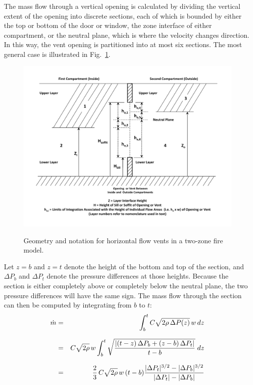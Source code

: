 The mass flow through a vertical opening is calculated by dividing the vertical extent of the opening into discrete sections, each of which is bounded by either the top or bottom of the door or window, the zone interface of either compartment, or the neutral plane, which is where the velocity changes direction. In this way, the vent opening is partitioned into at most six sections.  The most general case is illustrated in Fig.~\ref{fig:Flow_Notation}.
\begin{figure}[ht]
\begin{center}
\includegraphics[width=6.0in]{FIGURES/Theory/Flow_Notation}\\
\end{center}
\caption{Geometry and notation for horizontal flow vents in a two-zone fire model.}
 \label{fig:Flow_Notation}
\end{figure}
Let $z=b$ and $z=t$ denote the height of the bottom and top of the section, and $\Delta P_b$ and $\Delta P_t$ denote the pressure differences at those heights.  Because the section is either completely above or completely below the neutral plane, the two pressure differences will have the same sign. The mass flow through the section can then be computed by integrating from $b$ to $t$:
\begin{eqnarray}
\dot{m} &=& \int_b^t C \sqrt{2 \rho \, \Delta P(z)} \, w \, dz  \\[.1in]
    &=& C\sqrt{2\rho} \, w \int_b^t\sqrt{\frac{|(t-z) \, \Delta P_b + (z-b) \, \Delta P_t|}{t-b}} \; dz \\[.1in]
    &=& \frac{2}{3} \, C \sqrt{2\rho} \, w \, (t-b)\frac{|\Delta P_t|^{3/2}-|\Delta P_b|^{3/2}}{|\Delta P_t|-|\Delta P_b|}
\label{eq:massflowone}
\end{eqnarray}
